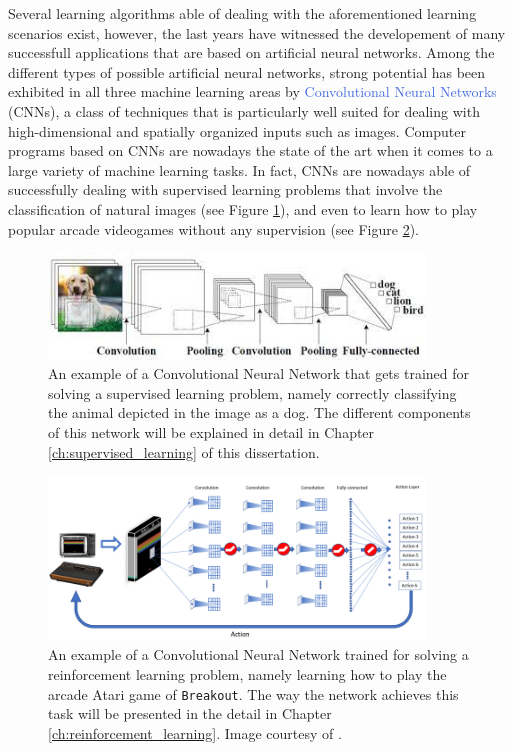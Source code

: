 Several learning algorithms able of dealing with the aforementioned learning scenarios exist, however, the last years have witnessed the developement of many successfull applications that are based on artificial neural networks. Among the different types of possible artificial neural networks, strong potential has been exhibited in all three machine learning areas by \textcolor{RoyalBlue}{Convolutional Neural Networks} (CNNs), a class of techniques that is particularly well suited for dealing with high-dimensional and spatially organized inputs such as images. Computer programs based on CNNs are nowadays the state of the art when it comes to a large variety of machine learning tasks. In fact, CNNs are nowadays able of successfully dealing with supervised learning problems that involve the classification of natural images (see Figure \ref{fig:dogo}), and even to learn how to play popular arcade videogames without any supervision (see Figure \ref{fig:dqn_example}).

\begin{figure}[ht!]
\centering
  \includegraphics[width=10cm]{./Images/Chapter00/dogo}
  \caption{An example of a Convolutional Neural Network that gets trained for solving a supervised learning problem, namely correctly classifying the animal depicted in the image as a dog. The different components of this network will be explained in detail in Chapter \ref{ch:supervised_learning} of this dissertation.}
  \label{fig:dogo}
\end{figure}

\begin{figure}[ht!]
\centering
  \includegraphics[width=10cm]{./Images/Chapter00/dqn}
  \caption{An example of a Convolutional Neural Network trained for solving a reinforcement learning problem, namely learning how to play the arcade Atari game of \texttt{Breakout}. The way the network achieves this task will be presented in the detail in Chapter \ref{ch:reinforcement_learning}. Image courtesy of \citet{patel2019improved}.}
  \label{fig:dqn_example}
\end{figure}




